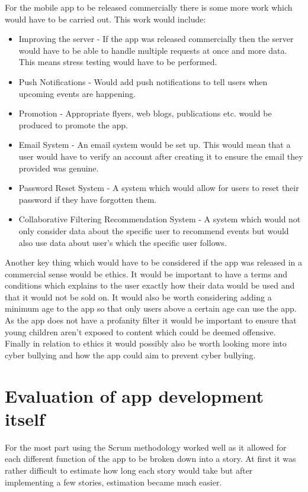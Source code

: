 For the mobile app to be released commercially there is some more work which would have to be carried out. This work would include:
\begin{itemize}
\item Improving the server - If the app was released commercially then the server would have to be able to handle multiple requests at once and more data. This means stress testing would have to be performed.
\item Push Notifications - Would add push notifications to tell users when upcoming events are happening.
\item Promotion - Appropriate flyers, web blogs, publications etc. would be produced to promote the app.
\item Email System - An email system would be set up. This would mean that a user would have to verify an account after creating it to ensure the email they provided was genuine.
\item Password Reset System - A system which would allow for users to reset their password if they have forgotten them.
\item Collaborative Filtering Recommendation System - A system which would not only consider data about the specific user to recommend events but would also use data about user's which the specific user follows.
\end{itemize} 
Another key thing which would have to be considered if the app was released in a commercial sense would be ethics. It would be important to have a terms and conditions which explains to the user exactly how their data would be used and that it would not be sold on. It would also be worth considering adding a minimum age to the app so that only users above a certain age can use the app. As the app does not have a profanity filter it would be important to ensure that young children aren't exposed to content which could be deemed offensive. Finally in relation to ethics it would possibly also be worth looking more into cyber bullying and how the app could aim to prevent cyber bullying.

\section{Evaluation of app development itself}
For the most part using the Scrum methodology worked well as it allowed for each different function of the app to be broken down into a story. At first it was rather difficult to estimate how long each story would take but after implementing a few stories, estimation became much easier.

